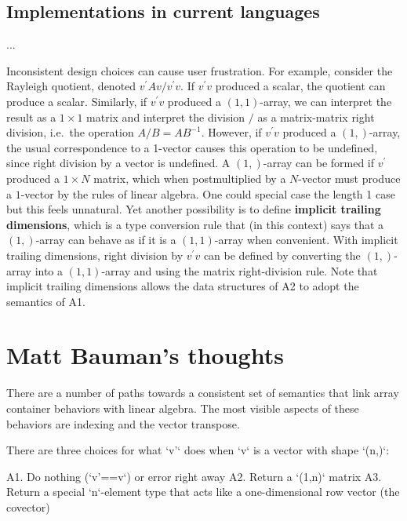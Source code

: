 \subsection{Implementations in current languages}


...

Inconsistent design choices can cause user frustration. For example,
consider the Rayleigh quotient, denoted $v^{\prime}Av/v^{\prime}v$.
If $v^{\prime}v$ produced a scalar, the quotient can produce a scalar.
Similarly, if $v^{\prime}v$ produced a $\left(1,1\right)$-array,
we can interpret the result as a $1\times1$ matrix and interpret
the division $/$ as a matrix-matrix right division, i.e.\ the operation
$A/B=AB^{-1}$. However, if $v^{\prime}v$ produced a $\left(1,\right)$-array,
the usual correspondence to a 1-vector causes this operation to be
undefined, since right division by a vector is undefined. A $(1,)$-array
can be formed if $v^{\prime}$ produced a $1\times N$ matrix, which
when postmultiplied by a $N$-vector must produce a $1$-vector by
the rules of linear algebra. One could special case the length 1 case
but this feels unnatural. Yet another possibility is to define \textbf{implicit
trailing dimensions}, which is a type conversion rule that (in this
context) says that a $(1,)$-array can behave as if it is a $(1,1)$-array
when convenient. With implicit trailing dimensions, right division
by $v^{\prime}v$ can be defined by converting the $(1,)$-array into
a $(1,1)$-array and using the matrix right-division rule. Note that
implicit trailing dimensions allows the data structures of A2 to adopt
the semantics of A1.


\section{Matt Bauman's thoughts}

There are a number of paths towards a consistent set of semantics that link
array container behaviors with linear algebra. The most visible aspects of
these behaviors are indexing and the vector transpose.


There are three choices for what `v'` does when `v` is a vector with shape `(n,)`:

A1. Do nothing (`v'==v`) or error right away
A2. Return a `(1,n)` matrix
A3. Return a special `n`-element type that acts like a one-dimensional row vector (the covector)


